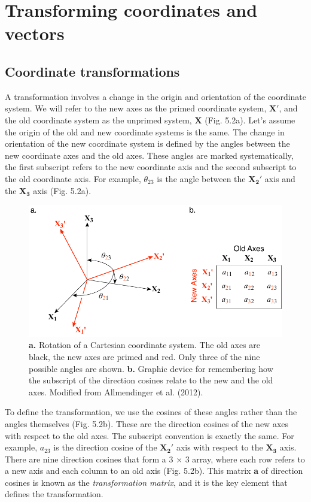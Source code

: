 \documentclass[a4paper , 12pt]{book}
\begin{document}
\section{Transforming coordinates and vectors}

\subsection{Coordinate transformations}

A transformation involves a change in the origin and orientation of the coordinate system. We will refer to the new axes as the primed coordinate system, $\mathbf{X\text{$'$}}$, and the old coordinate system as the unprimed system, $\mathbf{X}$ (Fig. 5.2a). Let's assume the origin of the old and new coordinate systems is the same. The change in orientation of the new coordinate system is defined by the angles between the new coordinate axes and the old axes. These angles are marked systematically, the first subscript refers to the new coordinate axis and the second subscript to the old coordinate axis. For example, $\theta_{23}$ is the angle between the $\mathbf{X_2\text{$'$}}$ axis and the $\mathbf{X_3}$ axis (Fig. 5.2a). 

 \begin{figure}[ht]
    \centering
    \includegraphics[width=12cm]{ch5f2.pdf}
    \caption{\textbf{a.} Rotation of a Cartesian coordinate system. The old axes are black, the new axes are primed and red. Only three of the nine possible angles are shown. \textbf{b.} Graphic device for remembering how the subscript of the direction cosines relate to the new and the old axes. Modified from Allmendinger et al. (2012).}
\end{figure}

To define the transformation, we use the cosines of these angles rather than the angles themselves (Fig. 5.2b). These are the direction cosines of the new axes with respect to the old axes. The subscript convention is exactly the same. For example, $a_{23}$ is the direction cosine of the $\mathbf{X_2\text{$'$}}$ axis with respect to the $\mathbf{X_3}$ axis. There are nine direction cosines that form a 3 $\times$ 3 array, where each row refers to a new axis and each column to an old axis (Fig. 5.2b). This matrix \textbf{a} of direction cosines is known as the \textit{transformation matrix}, and it is the key element that defines the transformation.
\end{document}

